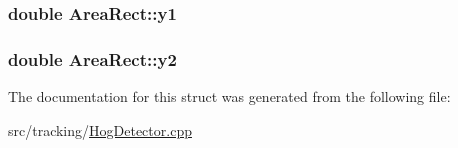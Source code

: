 \subsubsection[{\texorpdfstring{y1}{y1}}]{\setlength{\rightskip}{0pt plus 5cm}double Area\+Rect\+::y1}\hypertarget{struct_area_rect_add899b665dfaad3e0eff48e53ee0c004}{}\label{struct_area_rect_add899b665dfaad3e0eff48e53ee0c004}
\subsubsection[{\texorpdfstring{y2}{y2}}]{\setlength{\rightskip}{0pt plus 5cm}double Area\+Rect\+::y2}\hypertarget{struct_area_rect_a140d6087009cfb8ff32b3b439f808fd6}{}\label{struct_area_rect_a140d6087009cfb8ff32b3b439f808fd6}


The documentation for this struct was generated from the following file\+:\begin{DoxyCompactItemize}
\item 
src/tracking/\hyperlink{_hog_detector_8cpp}{Hog\+Detector.\+cpp}\end{DoxyCompactItemize}
